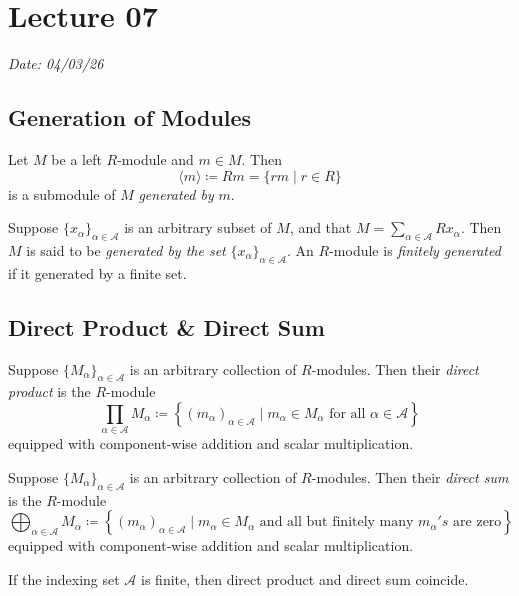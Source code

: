 \chapter{Lecture 07}

\hfill {\footnotesize \textit{Date: 04/03/26}}
\section{Generation of Modules}
Let \(M\) be a left  \(R\)-module and  \(m \in M\). Then 
 \[
\langle m \rangle \coloneq Rm = \{rm  \mid r \in R\} 
\] is a submodule of \(M\) \emph{generated by}  \(m\).

Suppose \(\{x_\alpha\}_{\alpha \in \mathcal{A}}\) is an arbitrary subset of \(M\), and that \(M = \sum_{\alpha \in \mathcal{A}} R x_\alpha\). Then  \(M\) is said to be \emph{generated by the set} \(\{x_\alpha\}_{\alpha \in \mathcal{A}}\). An \(R\)-module is \emph{finitely generated} if it generated by a finite set.

\section{Direct Product \& Direct Sum}
\begin{definition}
     Suppose \(\{M_\alpha\}_{\alpha \in \mathcal{A}}\) is an arbitrary collection of \(R\)-modules. Then their \emph{direct product} is the \(R\)-module 
    \[
        \prod_{\alpha \in \mathcal{A}} M_\alpha  \coloneq \left\{(m_\alpha)_{\alpha \in \mathcal{A}}  \mid m_\alpha \in M_\alpha \text{ for all } \alpha \in \mathcal{A}\right\}
    \]
    equipped with component-wise addition and scalar multiplication.
\end{definition}
\begin{definition}
    Suppose \(\{M_\alpha\}_{\alpha \in \mathcal{A}}\) is an arbitrary collection of \(R\)-modules. Then their \emph{direct sum} is the \(R\)-module 
    \[
         \bigoplus_{\alpha \in \mathcal{A}} M_\alpha  \coloneq \left\{(m_\alpha)_{\alpha \in \mathcal{A}}  \mid m_\alpha \in M_\alpha\text{ and all but finitely many } m_\alpha's \text{ are zero}\right\}
    \]
    equipped with component-wise addition and scalar multiplication.
\end{definition}
\begin{remark}
    If the indexing set \(\mathcal{A}\) is finite, then direct product and direct sum coincide.
\end{remark}
